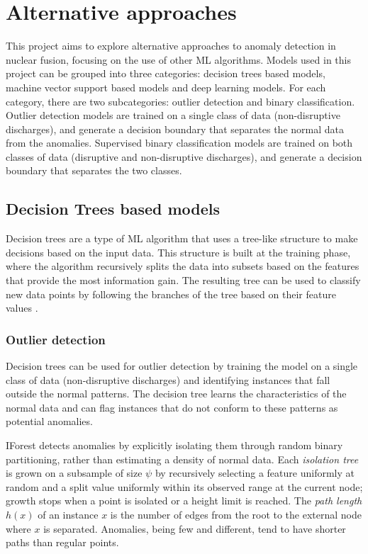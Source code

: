 \section{Alternative approaches}

This project aims to explore alternative approaches to anomaly detection in nuclear fusion, focusing on the use of other \ac{ML} algorithms. Models used in this project can be grouped into three categories: decision trees based models, machine vector support based models and deep learning models. For each category, there are two subcategories: outlier detection and binary classification. Outlier detection models are trained on a single class of data (non-disruptive discharges), and generate a decision boundary that separates the normal data from the anomalies. Supervised binary classification models are trained on both classes of data (disruptive and non-disruptive discharges), and generate a decision boundary that separates the two classes.

\subsection{Decision Trees based models}

Decision trees are a type of \ac{ML} algorithm that uses a tree-like structure to make decisions based on the input data. This structure is built at the training phase, where the algorithm recursively splits the data into subsets based on the features that provide the most information gain. The resulting tree can be used to classify new data points by following the branches of the tree based on their feature values \autocite{1522531}.

\subsubsection{Outlier detection}

Decision trees can be used for outlier detection by training the model on a single class of data (non-disruptive discharges) and identifying instances that fall outside the normal patterns. The decision tree learns the characteristics of the normal data and can flag instances that do not conform to these patterns as potential anomalies. 

\ac{IForest} detects anomalies by explicitly isolating them through random binary partitioning, rather than estimating a density of normal data. Each \emph{isolation tree} is grown on a subsample of size $\psi$ by recursively selecting a feature uniformly at random and a split value uniformly within its observed range at the current node; growth stops when a point is isolated or a height limit is reached. The \emph{path length} $h(x)$ of an instance $x$ is the number of edges from the root to the external node where $x$ is separated. Anomalies, being few and different, tend to have shorter paths than regular points.\autocite{inproceedings}

